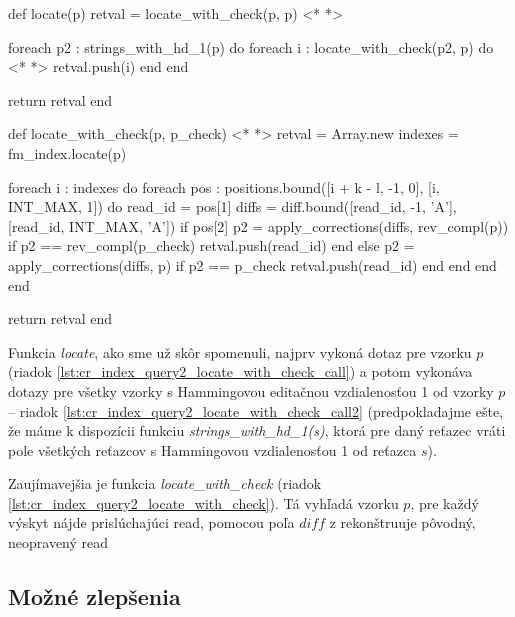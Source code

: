 \bigskip
\begin{pseudocode}[label=lst:cr_index_query2,caption={Algoritmus dotazu \emph{locate} CR-indexu nad readmi s chybami.}]
def locate(p) 
  retval = locate_with_check(p, p)  <* \label{lst:cr_index_query2_locate_with_check_call} *>  
  
  foreach p2 : strings_with_hd_1(p) do
    foreach i : locate_with_check(p2, p) do <* \label{lst:cr_index_query2_locate_with_check_call2} *> 
      retval.push(i)
    end
  end
  
  return retval
end

def locate_with_check(p, p_check) <* \label{lst:cr_index_query2_locate_with_check} *>  
  retval = Array.new
  indexes = fm_index.locate(p)
  
  foreach i : indexes do
    foreach pos : positions.bound([i + k - l, -1, 0],
                                  [i, INT_MAX, 1]) do
      read_id = pos[1]
      diffs = diff.bound([read_id, -1, 'A'],
                         [read_id, INT_MAX, 'A'])
      if pos[2]
        p2 = apply_corrections(diffs, rev_compl(p))
        if p2 == rev_compl(p_check)
          retval.push(read_id)
        end
      else
        p2 = apply_corrections(diffs, p)
        if p2 == p_check
          retval.push(read_id)
        end
      end
    end
  end
  
  return retval
end
\end{pseudocode}
\bigskip

Funkcia \emph{locate}, ako sme už skôr spomenuli, najprv vykoná dotaz pre vzorku $p$ (riadok \ref{lst:cr_index_query2_locate_with_check_call}) a potom vykonáva dotazy pre všetky vzorky s Hammingovou editačnou vzdialenosťou 1 od vzorky $p$ -- riadok \ref{lst:cr_index_query2_locate_with_check_call2} (predpokladajme ešte, že máme k dispozícii funkciu \emph{strings\_with\_hd\_1(s)}, ktorá pre daný reťazec vráti pole všetkých reťazcov s Hammingovou vzdialenosťou 1 od reťazca $s$).

Zaujímavejšia je funkcia \emph{locate\_with\_check} (riadok \ref{lst:cr_index_query2_locate_with_check}). Tá vyhľadá vzorku $p$, pre každý výskyt nájde prislúchajúci read, pomocou poľa $diff$ z rekonštruuje pôvodný, neopravený read



\subsection{Možné zlepšenia}

\newpage
{}\\
 \\
 \\
 \\
 \\
